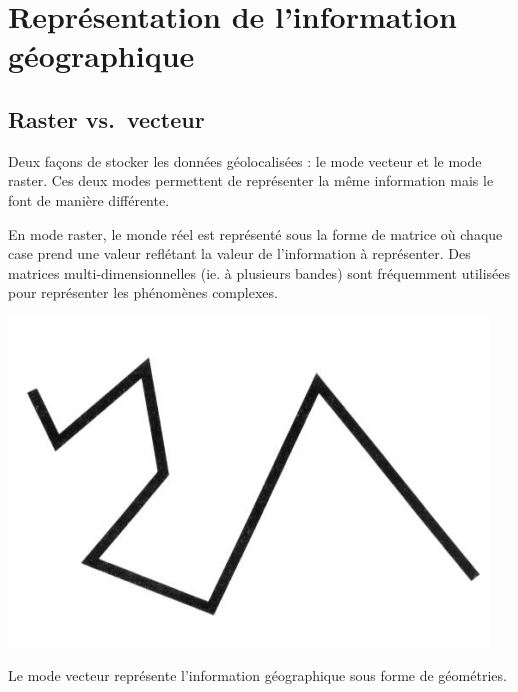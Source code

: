\documentclass[11pt]{article}
\makeatletter
\let\origfigure=\figure
\let\endorigfigure=\endfigure
\renewenvironment{figure}[1][]{%
  \origfigure[H]
}{%
  \endorigfigure
}
\def\maxwidth{\ifdim \Gin@nat@width > 0.8\linewidth 0.8\linewidth \else \Gin@nat@width \fi}
\let\oldincludegraphics\includegraphics
\renewcommand{\includegraphics}[1]{\oldincludegraphics[width=\maxwidth]{#1}}
\makeatother
\begin{document}
\hypertarget{repruxe9sentation-de-linformation-guxe9ographique}{%
\section{Représentation de l'information
géographique}\label{repruxe9sentation-de-linformation-guxe9ographique}}

\hypertarget{raster-vs.vecteur}{%
\subsection{Raster vs.~vecteur}\label{raster-vs.vecteur}}

Deux façons de stocker les données géolocalisées : le mode vecteur et le
mode raster. Ces deux modes permettent de représenter la même
information mais le font de manière différente.

En mode raster, le monde réel est représenté sous la forme de matrice où
chaque case prend une valeur reflétant la valeur de l'information à
représenter. Des matrices multi-dimensionnelles (ie. à plusieurs bandes)
sont fréquemment utilisées pour représenter les phénomènes complexes.

\begin{figure}
\centering
\includegraphics{img/cours1/representation_vecteur.png}
\caption{Représentation vecteur}
\end{figure}

Le mode vecteur représente l'information géographique sous forme de
géométries.
\end{document}
